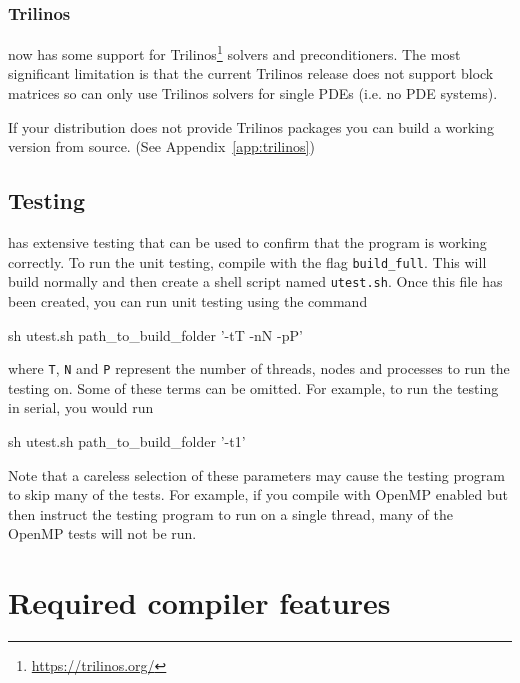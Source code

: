 \documentclass{esysdoc}
\begin{document}
\subsection{Trilinos}
\escript now has some support for Trilinos\footnote{\url{https://trilinos.org/}}
solvers and preconditioners.
The most significant limitation is that the current Trilinos release does not
support block matrices so \escript can only use Trilinos solvers for single
PDEs (i.e. no PDE systems).

If your distribution does not provide Trilinos packages you can build a working
version from source. (See Appendix~\ref{app:trilinos})


\section{Testing \escript}\label{chap:utest}

\escript has extensive testing that can be used to confirm that the program is working correctly. To run the unit testing, compile \escript with the flag \texttt{build_full}. This will build \escript normally and then create a shell script named \texttt{utest.sh}. Once this file has been created, you can run unit testing using the command
\begin{shellCode}
sh utest.sh path_to_build_folder '-tT -nN -pP'
\end{shellCode}
where \texttt{T}, \texttt{N} and \texttt{P} represent the number of threads, nodes and processes to run the testing on. Some of these terms can be omitted. For example, to run the testing in serial, you would run
\begin{shellCode}
sh utest.sh path_to_build_folder '-t1'
\end{shellCode}

Note that a careless selection of these parameters may cause the testing program to skip many of the tests. For example, if you compile \escript with OpenMP enabled but then instruct the testing program to run on a single thread, many of the OpenMP tests will not be run.


\esysappendix
\chapter{Required compiler features}
\label{app:cxxfeatures}
\end{document}
